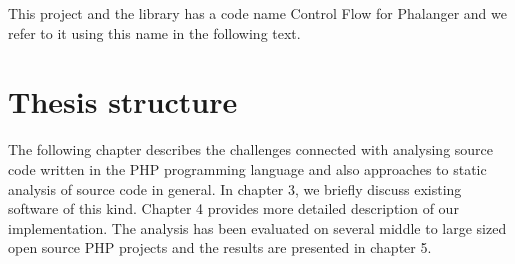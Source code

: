     This project and the library has a code name Control Flow for Phalanger 
    and we refer to it using this name in the following text.
    
    \section{Thesis structure}
    
    The following chapter describes the challenges connected with analysing source code 
    written in the PHP programming language and also approaches to static analysis of 
    source code in general. In chapter 3, we briefly discuss existing software of 
    this kind. Chapter 4 provides more detailed description of our implementation. 
    The analysis has been evaluated on several middle to large sized open source 
    PHP projects and the results are presented in chapter 5.
    